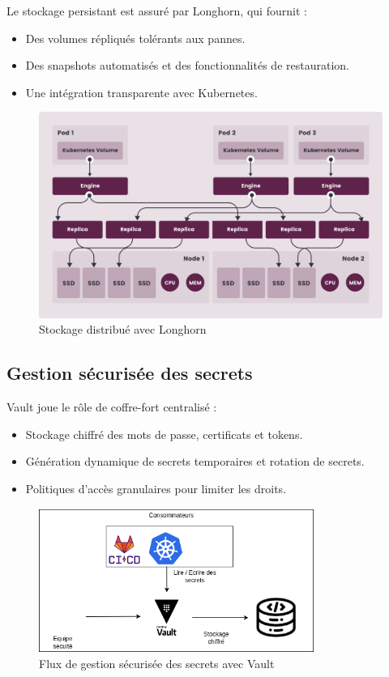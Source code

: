 Le stockage persistant est assuré par Longhorn, qui fournit :
\begin{itemize}
	\item Des volumes répliqués tolérants aux pannes.
	\item Des snapshots automatisés et des fonctionnalités de restauration.
	\item Une intégration transparente avec Kubernetes.
\end{itemize}

\begin{figure} [H]
	\centering
	\includegraphics[width=.5\textwidth]{figures/how-longhorn-works.png}
	\caption{Stockage distribué avec Longhorn}
\end{figure}

\subsection{Gestion sécurisée des secrets}

Vault joue le rôle de coffre-fort centralisé :
\begin{itemize}
	\item Stockage chiffré des mots de passe, certificats et tokens.
	\item Génération dynamique de secrets temporaires et rotation de secrets.
	\item Politiques d’accès granulaires pour limiter les droits.
\end{itemize}

\begin{figure}[H]
	\centering
	\includegraphics[width=0.8\textwidth]{figures/vault-gestion-secrets.png}
	\caption{Flux de gestion sécurisée des secrets avec Vault}
\end{figure}

